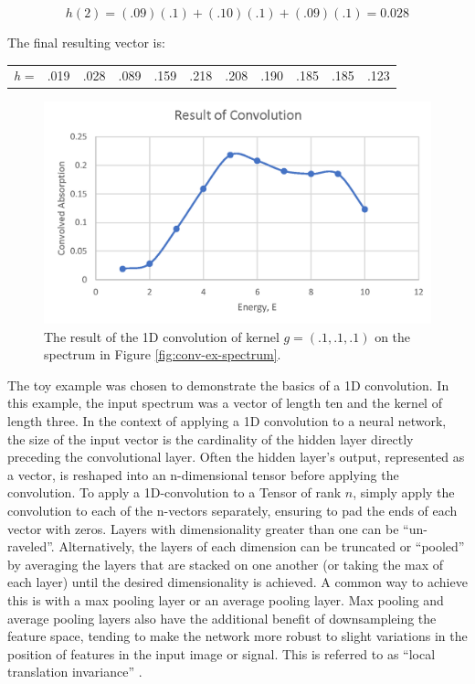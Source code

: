 $$ 
h(2) = (.09)(.1) + (.10)(.1) + (.09)(.1) = 0.028
$$

\noindent The final resulting vector is:

\begin{table}[h!]
    \centering
    \begin{tabular}{c|c|c|c|c|c|c|c|c|c|c|}
    \cline{2-11}
    \textit{h} = & .019 & .028 & .089 & .159 & .218 & .208 & .190 & .185 & .185 & .123 \\ \cline{2-11} 
    \end{tabular}
\end{table}

\begin{figure}[h!]
    \label{fig:conv-res-spectrum}
    \centering
    \includegraphics[width=.75\linewidth]{Chapters/Figures/conv-example-res.png}
    \caption[1D Convolution Result]{The result of the 1D convolution of kernel $ g = (.1, .1, .1) $  on the spectrum in Figure \ref{fig:conv-ex-spectrum}.}
\end{figure}

The toy example was chosen to demonstrate the basics of a 1D convolution. In this example, the input spectrum was a vector of length ten and the kernel of length three. In the context of applying a 1D convolution to a neural network, the size of the input vector is the cardinality of the hidden layer directly preceding the convolutional layer. Often the hidden layer's output, represented as a vector, is reshaped into an n-dimensional tensor before applying the convolution. To apply a 1D-convolution to a Tensor of rank $ n $, simply apply the convolution to each of the n-vectors separately, ensuring to pad the ends of each vector with zeros. Layers with dimensionality greater than one can be ``un-raveled''. Alternatively, the layers of each dimension can be truncated or ``pooled'' by averaging the layers that are stacked on one another (or taking the max of each layer) until the desired dimensionality is achieved. A common way to achieve this is with a max pooling layer or an average pooling layer. Max pooling and average pooling layers also have the additional benefit of downsampleing the feature space, tending to make the network more robust to slight variations in the position of features in the input image or signal. This is referred to as ``local translation invariance'' \cite{local-translation-invariance}.

